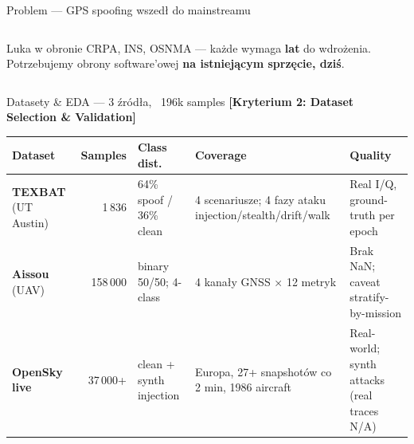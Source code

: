 \documentclass[10pt,aspectratio=169]{beamer}
\newcommand{\criterion}[1]{{\tiny\color{primaryLight}\textbf{[Kryterium #1]}}}
\begin{document}
\begin{frame}{Problem — GPS spoofing wszedł do mainstreamu}
\begin{columns}[T,onlytextwidth]
        \vspace{0.4em}
        \begin{alertblock}{Luka w obronie}
            \scriptsize CRPA, INS, OSNMA — każde wymaga \textbf{lat} do wdrożenia. Potrzebujemy obrony software'owej \textbf{na istniejącym sprzęcie, dziś}.
        \end{alertblock}
    \end{columns}
\end{frame}

\begin{frame}{Datasety \& EDA — 3 źródła, ~196k samples}
    \criterion{2: Dataset Selection \& Validation}
    \vspace{0.1cm}
    \scriptsize
    \begin{tabular}{@{}l r l p{3.4cm} p{3.0cm}@{}}
        \toprule
        \textbf{Dataset} & \textbf{Samples} & \textbf{Class dist.} & \textbf{Coverage} & \textbf{Quality} \\
        \midrule
        \textbf{TEXBAT} (UT Austin)
            & 1\,836
            & 64\% spoof / 36\% clean
            & 4 scenariusze; 4 fazy ataku injection/stealth/drift/walk
            & Real I/Q, ground-truth per epoch \\
        \addlinespace
        \textbf{Aissou} (UAV)
            & 158\,000
            & binary 50/50; 4-class
            & 4 kanały GNSS × 12 metryk
            & Brak NaN; caveat stratify-by-mission \\
        \addlinespace
        \textbf{OpenSky live}
            & 37\,000+
            & clean + synth injection
            & Europa, 27+ snapshotów co 2 min, 1986 aircraft
            & Real-world; synth attacks (real traces N/A) \\
        \bottomrule
    \end{tabular}


\end{frame}
\end{document}
